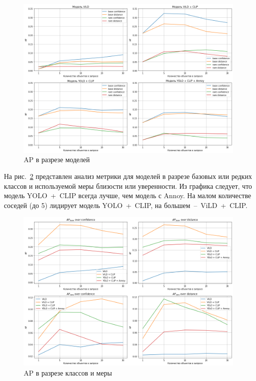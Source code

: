 \documentclass[a4paper,14pt]{article}
\begin{document}
	\begin{figure}[H]
		\centering
		\includegraphics[width=0.999\linewidth]{images/average_precision_dataset}
		\caption{AP в разрезе моделей}
		\label{fig:average_precision_dataset}
	\end{figure}
	
	На рис.~\ref{fig:average_precision_metrics} представлен анализ метрики для моделей в разрезе базовых или редких классов и используемой меры близости или уверенности.
	Из графика следует, что модель YOLO~+~CLIP всегда лучше, чем модель с Annoy.
	На малом количестве соседей (до 5) лидирует модель YOLO~+~CLIP, на большем~--~ViLD~+~CLIP.
	
	\begin{figure}[H]
		\centering
		\includegraphics[width=0.999\linewidth]{images/average_precision_metrics}
		\caption{AP в разрезе классов и меры}
		\label{fig:average_precision_metrics}
	\end{figure}
\end{document}
